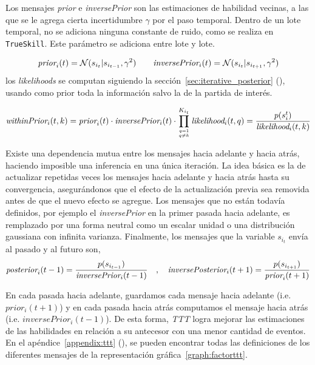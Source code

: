 \documentclass[11pt,twoside,spanish]{report} %
\newcommand\hfrac[2]{\genfrac{}{}{0pt}{}{#1}{#2}}
\begin{document}
Los mensajes \emph{prior} e \emph{inversePrior} son las estimaciones de habilidad vecinas, a las que se le agrega cierta incertidumbre $\gamma$ por el paso temporal.
Dentro de un lote temporal, no se adiciona ninguna constante de ruido, como se realiza en \texttt{TrueSkill}. 
Este par\'ametro se adiciona entre lote y lote.


\begin{equation*}
\emph{prior}_i(t) = \mathcal{N}(s_{i_t}|s_{i_{t-1}}, \gamma^2) \ \ \ \ \ \ \emph{inversePrior}_i(t) = \mathcal{N}(s_{i_t}|s_{i_{t+1}}, \gamma^2)
\end{equation*}
%
los \textit{likelihoods} se computan siguiendo la secci\'on~\ref{sec:iterative_posterior} (), usando como prior toda la informaci\'on salvo la de la partida de inter\'es.

 \begin{equation}
 \emph{withinPrior}_i(t,k) = \emph{prior}_i(t) \cdot \emph{inversePrior}_i(t) \cdot \prod_{\hfrac{q=1}{q\neq k}}^{K_{i_t}} \emph{likelihood}_i(t,q) = \frac{p(s_i^t) }{\emph{likelihood}_i(t,k)}
 \end{equation}
 
Existe una dependencia mutua entre los mensajes hacia adelante y hacia atr\'as, haciendo imposible una inferencia en una \'unica iteraci\'on.
La idea b\'asica es la de actualizar repetidas veces los mensajes hacia adelante y hacia atr\'as hasta su convergencia, asegur\'andonos que el efecto de la actualizaci\'on previa sea removida antes de que el nuevo efecto se agregue.
Los mensajes que no est\'an todav\'ia definidos, por ejemplo el \emph{inversePrior} en la primer pasada hacia adelante, es remplazado por una forma neutral como un escalar unidad o una distribuci\'on gaussiana con infinita varianza.
Finalmente, los mensajes que la variable $s_{i_t}$ env\'ia al pasado y al futuro son,
%
\begin{equation*}
  \emph{posterior}_i(t-1) = \frac{p(s_{i_{t-1}})}{\emph{inversePrior}_i(t-1)} \ \ \ , \ \ \ \emph{inversePosterior}_i(t+1) = \frac{p(s_{i_{t+1}})}{\emph{prior}_i(t+1)}
\end{equation*}

En cada pasada hacia adelante, guardamos cada mensaje hacia adelante (i.e. $prior_i(t+1)$) y en cada pasada hacia atr\'as computamos el mensaje hacia atr\'as (i.e. $inversePrior_i(t-1)$).
De esta forma, \textit{TTT} logra mejorar las estimaciones de las habilidades en relaci\'on a su antecesor con una menor cantidad de eventos.
En el ap\'endice~\ref{appendix:ttt} (), se pueden encontrar todas las definiciones de los diferentes mensajes de la representaci\'on gr\'afica~\ref{graph:factorttt}.
 
\end{document}
